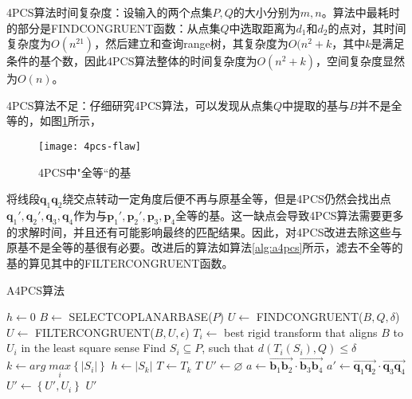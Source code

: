 {\kai 4PCS算法时间复杂度：}设输入的两个点集$P,Q$的大小分别为$m,n$。算法中最耗时的部分是FINDCONGRUENT函数：从点集$Q$中选取距离为$d_1$和$d_2$的点对，其时间复杂度为$O(n^21)$，然后建立和查询range树，其复杂度为$O(n^2+k$，其中$k$是满足条件的基个数，因此4PCS算法整体的时间复杂度为$O(n^2+k)$，空间复杂度显然为$O(n)$。

{\kai 4PCS算法不足：}仔细研究4PCS算法，可以发现从点集$Q$中提取的基与$B$并不是全等的，如图\ref{fig:4pcs-flaw}所示，
\begin{figure}[ht]
  \centering
  \texttt{[image: 4pcs-flaw]}
  \caption{4PCS中"全等“的基}
  \label{fig:4pcs-flaw}
\end{figure}
将线段$\mathbf{q}_1\mathbf{q}_2$绕交点转动一定角度后便不再与原基全等，但是4PCS仍然会找出点$\mathbf{q}_1',\mathbf{q}_2',\mathbf{q}_3,\mathbf{q}_4$作为与$\mathbf{p}_1',\mathbf{p}_2',\mathbf{p}_3,\mathbf{p}_4$全等的基。这一缺点会导致4PCS算法需要更多的求解时间，并且还有可能影响最终的匹配结果。因此，对4PCS改进去除这些与原基不是全等的基很有必要。改进后的算法如算法\ref{alg:a4pcs}所示，滤去不全等的基的算见其中的FILTERCONGRUENT函数。
\begin{algorithm}
  \caption{A4PCS算法}
  \label{alg:a4pcs}
  $h\leftarrow 0$\;
   {
    $B\leftarrow$ SELECTCOPLANARBASE($P$)\;
    $U\leftarrow$ FINDCONGRUENT($B,Q,\delta$)\;
    $U\leftarrow$ FILTERCONGRUENT($B,U,\epsilon$)\;
     {
      $T_i\leftarrow$ best rigid transform that aligns $B$ to $U_i$ in the least square sense\;
      Find $S_i\subseteq P$, such that $d(T_i(S_i), Q)\leq\delta$\;
    }
    $k\leftarrow arg\;\underset{i}{max}\left\{|S_i|\right\}$\;
     {
      $h\leftarrow |S_k|$\;
      $T\leftarrow T_k$\;
    }
    \Return $T$\;
  }
  \BlankLine
  \BlankLine
  \BlankLine
  \BlankLine
   {
    $U'\leftarrow \varnothing$\;
    $a\leftarrow \overrightarrow{\mathbf{b}_1\mathbf{b}_2}\cdot \overrightarrow{\mathbf{b}_3\mathbf{b}_4}$\;
     {
      $a'\leftarrow \overrightarrow{\mathbf{q}_1\mathbf{q}_2}\cdot \overrightarrow{\mathbf{q}_3\mathbf{q}_4}$\;
       {
        $U'\leftarrow \left\{U',U_i\right\}$\;
      }
    }
    \Return $U'$\;
  }
\end{algorithm}

